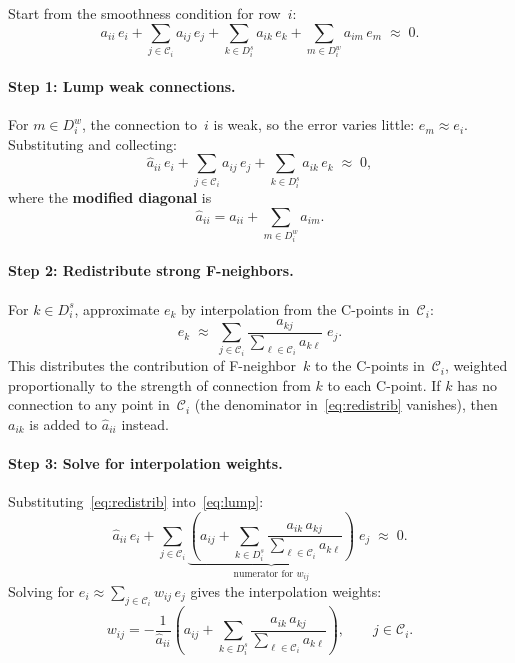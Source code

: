 \documentclass[11pt]{article}
\newcommand{\CC}{\mathcal{C}}
\begin{document}
Start from the smoothness condition for row~$i$:
\begin{equation}
  \label{eq:smooth}
  a_{ii}\,e_i + \sum_{j \in \CC_i} a_{ij}\,e_j
    + \sum_{k \in D_i^s} a_{ik}\,e_k
    + \sum_{m \in D_i^w} a_{im}\,e_m \;\approx\; 0.
\end{equation}

\paragraph{Step 1: Lump weak connections.}
For $m \in D_i^w$, the connection to~$i$ is weak, so the error varies
little: $e_m \approx e_i$.  Substituting and collecting:
\begin{equation}
  \label{eq:lump}
  \hat{a}_{ii}\,e_i + \sum_{j \in \CC_i} a_{ij}\,e_j
    + \sum_{k \in D_i^s} a_{ik}\,e_k \;\approx\; 0,
\end{equation}
where the \textbf{modified diagonal} is
\begin{equation}
  \label{eq:diaghat}
  \hat{a}_{ii} = a_{ii} + \sum_{m \in D_i^w} a_{im}.
\end{equation}

\paragraph{Step 2: Redistribute strong F-neighbors.}
For $k \in D_i^s$, approximate $e_k$ by interpolation from the
C-points in~$\CC_i$:
\begin{equation}
  \label{eq:redistrib}
  e_k \;\approx\; \sum_{j \in \CC_i}
    \frac{a_{kj}}{\displaystyle\sum_{\ell \in \CC_i} a_{k\ell}}\;e_j.
\end{equation}
This distributes the contribution of F-neighbor~$k$ to the C-points
in~$\CC_i$, weighted proportionally to the strength of connection from
$k$ to each C-point.  If $k$ has no connection to any point in~$\CC_i$
(the denominator in~\eqref{eq:redistrib} vanishes), then $a_{ik}$ is
added to $\hat{a}_{ii}$ instead.

\paragraph{Step 3: Solve for interpolation weights.}
Substituting~\eqref{eq:redistrib} into~\eqref{eq:lump}:
\[
  \hat{a}_{ii}\,e_i + \sum_{j \in \CC_i}
    \underbrace{\left(a_{ij} + \sum_{k \in D_i^s}
      \frac{a_{ik}\,a_{kj}}{\displaystyle\sum_{\ell \in \CC_i} a_{k\ell}}
    \right)}_{\text{numerator for } w_{ij}}\;e_j \;\approx\; 0.
\]
Solving for $e_i \approx \sum_{j \in \CC_i} w_{ij}\,e_j$ gives the
interpolation weights:
\begin{equation}
  \label{eq:weights}
  \boxed{
    w_{ij} = -\frac{1}{\hat{a}_{ii}}
    \left(a_{ij} + \sum_{k \in D_i^s}
      \frac{a_{ik}\,a_{kj}}{\displaystyle\sum_{\ell \in \CC_i} a_{k\ell}}
    \right),
    \qquad j \in \CC_i.
  }
\end{equation}
\end{document}
